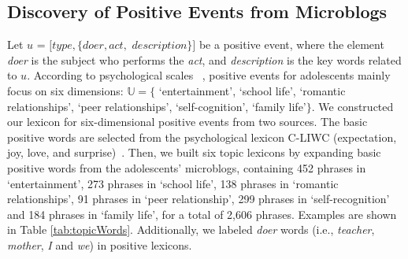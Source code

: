\documentclass[5p,times,numbers,authoryear]{elsarticle}
\begin{document}
\subsection{Discovery of Positive Events from Microblogs}
\label{sec:frame1}
Let $u$ = $[type,\{doer, act,$ $description\}]$ be a positive event,
where the element \emph{doer} is the subject who performs the \emph{act},
and \emph{description} is the key words related to $u$.
According to psychological scales ~\citep{Jun2008Influence,hassles},
positive events for adolescents mainly focus on six dimensions:  $\mathbb{U} =\{$ `entertainment', `school life', `romantic relationships', `peer relationships', `self-cognition', `family life'$\}$. We constructed our lexicon for six-dimensional positive events from two sources.
The basic positive words are selected from the psychological lexicon C-LIWC (expectation, joy, love, and surprise)~\citep{Tausczik2010The}.
Then, we built six topic lexicons by expanding basic positive words from the adolescents' microblogs, containing 452 phrases in `entertainment',
273 phrases in `school life',
138 phrases in `romantic relationships',
91 phrases in `peer relationship',
299 phrases in `self-recognition' and 184 phrases in `family life', for a total of 2,606 phrases.
Examples are shown in Table \ref{tab:topicWords}.
Additionally, we labeled \emph{doer} words (i.e., \emph{teacher}, \emph{mother}, \emph{I} and \emph{we}) in positive lexicons.
\end{document}
